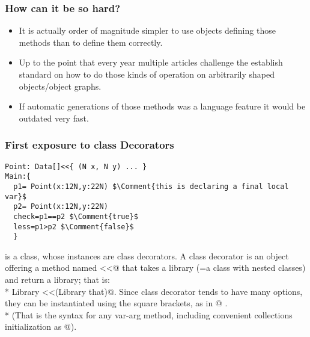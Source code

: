 \begin{frame}[fragile]
\frametitle{How can it be so hard?}
\begin{itemize}
\item It is actually order of magnitude  simpler to use objects defining those methods than to define them correctly.
\PresentationOnly\pause\item Up to the point that every year multiple articles challenge  the establish standard on how to
do those kinds of operation on arbitrarily shaped objects/object graphs.
\PresentationOnly\pause\item If automatic generations of those methods was a language feature
it would be outdated very fast.
\end{itemize}
\end{frame}


\begin{frame}[fragile]
\frametitle{First exposure to class Decorators}
\begin{NiceCode}{59ex}{0.8}
\begin{lstlisting}
Point: Data[]<<{ (N x, N y) ... }
Main:{
  p1= Point(x:12N,y:22N) $\Comment{this is declaring a final local var}$
  p2= Point(x:12N,y:22N)
  check=p1==p2 $\Comment{true}$
  less=p1>p2 $\Comment{false}$
  }
\end{lstlisting}
\end{NiceCode}
\Q@Data@  is a class, whose instances are class decorators.
A class decorator is an object offering  a method named \Q@<<@ that takes a library (=a class with nested classes) and return a library; that is:\\*
\Q@method Library <<(Library that)@.
Since class decorator tends to have many options, they can be instantiated using the square brackets, as in @  .\\*
(That is the syntax for any var-arg method, including convenient collections initialization as \Q@NVec[a;b;c;]@).

\end{frame}



